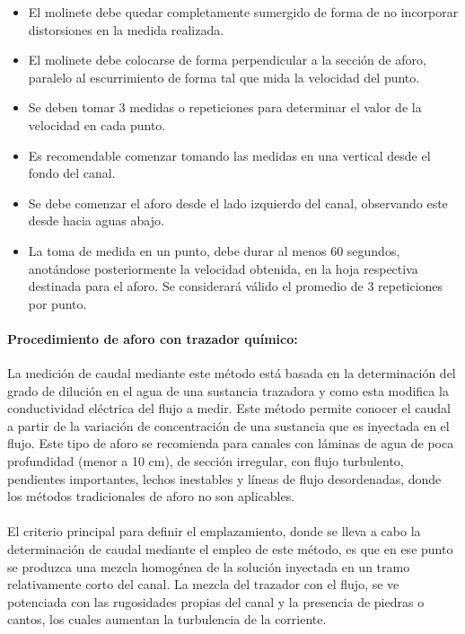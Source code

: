 \documentclass[]{article}
\providecommand{\tightlist}{%
  \setlength{\itemsep}{0pt}\setlength{\parskip}{0pt}}
\begin{document}
\begin{itemize}
\tightlist
\item El molinete debe quedar completamente sumergido de forma de no incorporar distorsiones en la medida realizada.
\item El molinete debe colocarse de forma perpendicular a la sección de aforo, paralelo al escurrimiento de forma tal que mida la velocidad del punto.
\item Se deben tomar 3 medidas o repeticiones para determinar el valor de la velocidad en cada punto.
\item Es recomendable comenzar tomando las medidas en una vertical desde el fondo del canal.
\item Se debe comenzar el aforo desde el lado izquierdo del canal, observando este desde hacia aguas abajo.
\item La toma de medida en un punto, debe durar al menos 60 segundos, anotándose posteriormente la velocidad obtenida, en la hoja respectiva destinada para el aforo. Se considerará válido el promedio de 3 repeticiones por punto.
\end{itemize}

\paragraph{Procedimiento de aforo con trazador químico:}

La medición de caudal mediante este método está basada en la determinación del grado de dilución en el agua de una sustancia trazadora y como esta modifica la conductividad eléctrica del flujo a medir. Este método permite conocer el caudal a partir de la variación de concentración de una sustancia que es inyectada en el flujo. Este tipo de aforo se recomienda para canales con láminas de agua de poca profundidad (menor a 10 cm), de sección irregular, con flujo turbulento, pendientes importantes, lechos inestables y líneas de flujo desordenadas, donde los métodos tradicionales de aforo no son aplicables.\\
\\
El criterio principal para definir el emplazamiento, donde se lleva a cabo la determinación de caudal mediante el empleo de este método, es que en ese punto se produzca una mezcla homogénea de la solución inyectada en un tramo relativamente corto del canal. La mezcla del trazador con el flujo, se ve potenciada con las rugosidades propias del canal y la presencia de piedras o cantos, los cuales aumentan la turbulencia de la corriente.
\end{document}

